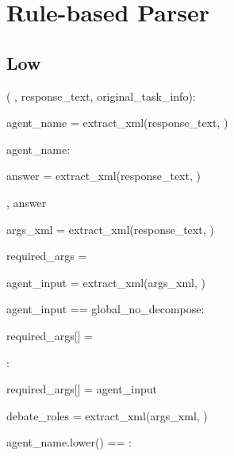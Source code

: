 \section{Rule-based Parser}
\label{app:parser}

\subsection{Low \masness}


\begin{subagent}[title=Low \masness Parser]

  (
, response\_text, original\_task\_info):

\quad {}

\quad agent\_name = extract\_xml(response\_text, )

\quad {}  agent\_name:

\quad\quad {}

\quad\quad answer = extract\_xml(response\_text, )

\quad\quad {} , answer \\


\quad {}

\quad args\_xml = extract\_xml(response\_text, )

\quad required\_args = \code{\{\}} \\

\quad {}

\quad agent\_input = extract\_xml(args\_xml, )

\quad {} agent\_input ==   global\_no\_decompose:

\quad\quad required\_args[] = 

\quad {}:

\quad\quad required\_args[] = agent\_input \\


\quad {}

\quad debate\_roles = extract\_xml(args\_xml, )

\quad {} agent\_name.lower() == :


\end{subagent}

